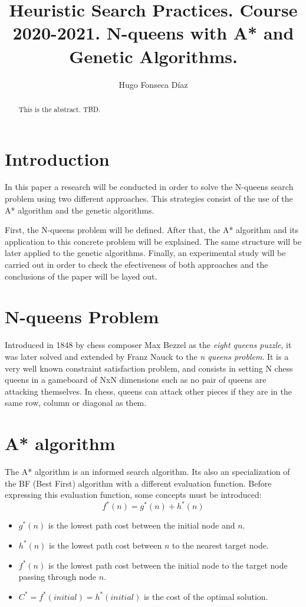 \documentclass[11pt]{llncs}
\begin{document}
\title{Heuristic Search Practices. Course 2020-2021. N-queens with A* and Genetic Algorithms.}
\author{Hugo Fonseca Díaz\\ }
\maketitle
\begin{abstract}
This is the abstract. TBD.
\end{abstract}
\section{Introduction}\label{introduction}
In this paper a research will be conducted in order to solve the N-queens search problem using two different approaches. This strategies consist of the use of the A* algorithm and the genetic algorithms.

First, the N-queens problem will be defined. After that, the A* algorithm and its application to this concrete problem will be explained. The same structure will be later applied to the genetic algorithms. Finally, an experimental study will be carried out in order to check the efectiveness of both approaches and the conclusions of the paper will be layed out.
\section{N-queens Problem}\label{nqueens_problem}
Introduced in 1848 by chess composer Max Bezzel as the \textit{eight queens puzzle}, it was later solved and extended by Franz Nauck to the \textit{n queens problem}. It is a very well known constraint satisfaction problem, and consists in setting N chess queens in a gameboard of NxN dimensions such as no pair of queens are attacking themselves. In chess, queens can attack other pieces if they are in the same row, column or diagonal as them.
\section{A* algorithm}\label{astar_alg}
The A* algorithm is an informed search algorithm. Its also an specialization of the BF (Best First) algorithm with a different evaluation function. Before expressing this evaluation function, some concepts must be introduced:
\[f^{*}(n) = g^{*}(n) + h^{*}(n)\]
\begin{itemize}
    \item $g^{*}(n)$ is the lowest path cost between the initial node and $n$.
    \item $h^{*}(n)$ is the lowest path cost between $n$ to the nearest target node.
    \item $f^{*}(n)$ is the lowest path cost between the initial node to the target node passing through node $n$. 
    \item $C^{*} = f^{*}(initial) = h^{*}(initial)$ is the cost of the optimal solution. 
\end{itemize}
\end{document}
